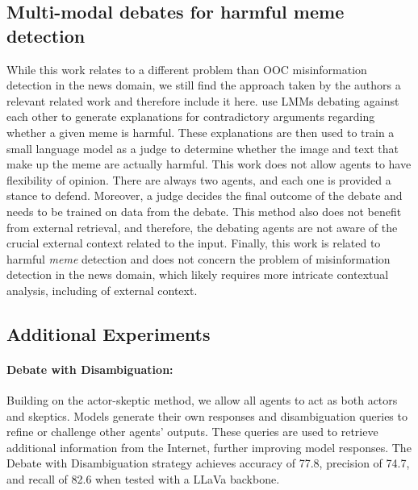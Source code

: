 \documentclass{article}
\theoremstyle{plain}
\theoremstyle{definition}
\theoremstyle{remark}
\begin{document}
\subsection{Multi-modal debates for harmful meme detection}
While this work relates to a different problem than OOC misinformation detection in the news domain, we still find the approach taken by the authors a relevant related work and therefore include it here.
\citet{lin2024explainableharmfulmemedetection} use LMMs debating against each other to generate explanations for contradictory arguments regarding whether a given meme is harmful. These explanations are then used to train a small language model as a judge to determine whether the image and text that make up the meme are actually harmful. %
This work does not allow agents to have flexibility of opinion. There are always two agents, and each one is provided a stance to defend. Moreover, a judge decides the final outcome of the debate and needs to be trained on data from the debate. This method also does not benefit from external retrieval, and therefore, the debating agents are not aware of the crucial external context related to the input. Finally, this work is related to harmful \textit{meme} detection and does not concern the problem of misinformation detection in the news domain, which likely requires more intricate contextual analysis, including of external context.


\subsection{Additional Experiments}\label{app:additional}

\paragraph{Debate with Disambiguation:} Building on the actor-skeptic method, we allow all agents to act as both actors and skeptics. Models generate their own responses and disambiguation queries to refine or challenge other agents' outputs. These queries are used to retrieve additional information from the Internet, further improving model responses. The Debate with Disambiguation strategy achieves accuracy of 77.8, precision of 74.7, and recall of 82.6 when tested with a LLaVa backbone.
\end{document}
